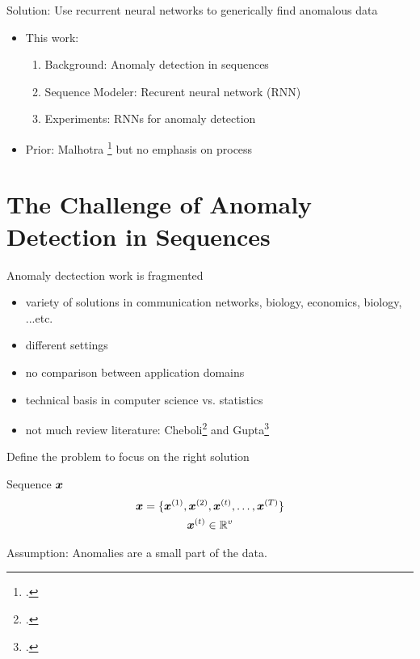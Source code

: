 \documentclass{beamer}
\begin{document}
  \begin{frame}{Solution: Use recurrent neural networks to generically find anomalous data}

    \begin{itemize}
      \item This work:
    \begin{enumerate}
      \item Background: Anomaly detection in sequences
      \item Sequence Modeler: Recurent neural network (RNN)
      \item Experiments: RNNs for anomaly detection
    \end{enumerate}

    \item Prior: Malhotra \footcite{Malhotra2015} but no emphasis on process
    \end{itemize}

  \end{frame}


  \section{The Challenge of Anomaly Detection in Sequences}

  \begin{frame}{Anomaly dectection work is fragmented}
    \begin{itemize}
    \item variety of solutions in communication networks, biology, economics, biology, ...etc.
    \item different settings
    \item no comparison between application domains
    \item technical basis in computer science vs. statistics
    \item not much review literature:
      Cheboli\footcite{Cheboli2010}
      and Gupta\footcite{Gupta2013}
    \end{itemize}
  \end{frame}


  \begin{frame}{Define the problem to focus on the right solution}

    Sequence $\boldsymbol{x}$
    \begin{gather*}
      \boldsymbol{x}=\{\boldsymbol{x}\sp{(1)},\boldsymbol{x}\sp{(2)},\boldsymbol{x}\sp{(t)},\ldots,\boldsymbol{x}\sp{(T)}\} \\
      \boldsymbol{x}\sp{(t)} \in \mathbb{R}^v
    \end{gather*}%

    Assumption: Anomalies are a small part of the data.

  \end{frame}
\end{document}
